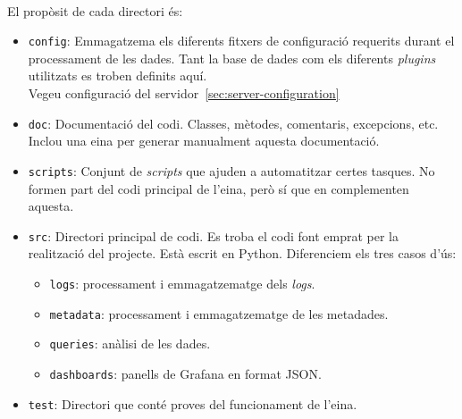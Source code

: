\noindent \\
El propòsit de cada directori és:

\begin{itemize}
    \item \texttt{config}: Emmagatzema els diferents fitxers de configuració requerits durant el processament de les dades.
    Tant la base de dades com els diferents \textit{\gls{plugin}s} utilitzats es troben definits aquí. \\
    Vegeu configuració del servidor~\ref{sec:server-configuration}
    \item \texttt{doc}: Documentació del codi.
    Classes, mètodes, comentaris, excepcions, etc.
    Inclou una eina per generar manualment aquesta documentació.
    \item \texttt{scripts}: Conjunt de \textit{scripts} que ajuden a automatitzar certes tasques.
    No formen part del codi principal de l'eina, però sí que en complementen aquesta.
    \item \texttt{src}: Directori principal de codi.
    Es troba el codi font emprat per la realització del projecte.
    Està escrit en Python.
    Diferenciem els tres casos d'ús:
    \begin{itemize}
        \item \texttt{logs}: processament i emmagatzematge dels \textit{logs}.
        \item \texttt{metadata}: processament i emmagatzematge de les metadades.
        \item \texttt{queries}: anàlisi de les dades.
        \item \texttt{dashboards}: panells de Grafana en format \gls{JSON}.
    \end{itemize}
    \item \texttt{test}: Directori que conté proves del funcionament de l'eina.
\end{itemize}

